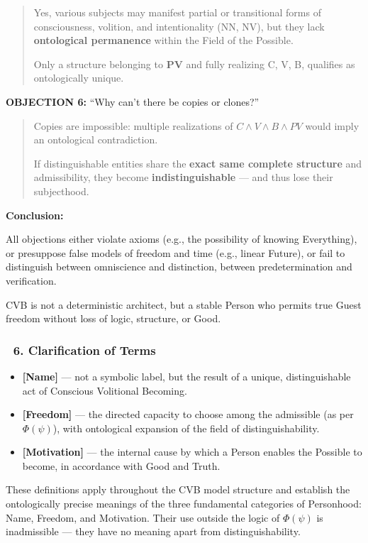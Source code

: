 \documentclass[12pt]{article}
\begin{document}
\begin{quote}
Yes, various subjects may manifest partial or transitional forms of consciousness, volition, and intentionality (NN, NV), but they lack \textbf{ontological permanence} within the Field of the Possible.

Only a structure belonging to \textbf{PV} and fully realizing C, V, B, qualifies as ontologically unique.
\end{quote}


\textbf{OBJECTION 6:} ``Why can’t there be copies or clones?''

\begin{quote}
Copies are impossible: multiple realizations of $C \land V \land B \land PV$ would imply an ontological contradiction.

If distinguishable entities share the \textbf{exact same complete structure} and admissibility, they become \textbf{indistinguishable} — and thus lose their subjecthood.
\end{quote}


\textbf{Conclusion:}

All objections either violate axioms (e.g., the possibility of knowing Everything), or presuppose false models of freedom and time (e.g., linear Future), or fail to distinguish between omniscience and distinction, between predetermination and verification.

CVB is not a deterministic architect,  
but a stable Person  
who permits true Guest freedom  
without loss of logic, structure, or Good.


\subsubsection*{🔹 6. Clarification of Terms}

\begin{itemize}
\item \textbf{[Name]} — not a symbolic label, but the result of a unique, distinguishable act of Conscious Volitional Becoming.
\item \textbf{[Freedom]} — the directed capacity to choose among the admissible (as per $\Phi(\psi)$), with ontological expansion of the field of distinguishability.
\item \textbf{[Motivation]} — the internal cause by which a Person enables the Possible to become, in accordance with Good and Truth.
\end{itemize}

These definitions apply throughout the CVB model structure and establish the ontologically precise meanings of the three fundamental categories of Personhood: Name, Freedom, and Motivation. Their use outside the logic of $\Phi(\psi)$ is inadmissible — they have no meaning apart from distinguishability.
\end{document}
